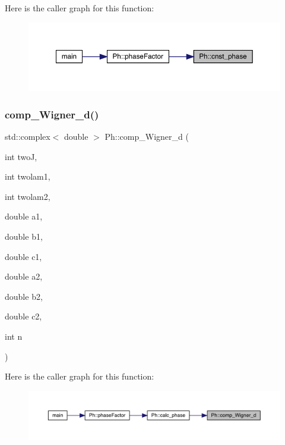Here is the caller graph for this function\+:\nopagebreak
\begin{figure}[H]
\begin{center}
\leavevmode
\includegraphics[width=350pt]{d6/d3c/namespacePh_ac0bb2f4b2888c7c304cb6fcb1b5a7ce2_icgraph}
\end{center}
\end{figure}
\mbox{\label{namespacePh_a65b264daca1c3c0fcc6f1dc55d729cd4}} 
\subsubsection{\texorpdfstring{comp\_Wigner\_d()}{comp\_Wigner\_d()}}
{\footnotesize\ttfamily std\+::complex$<$ double $>$ Ph\+::comp\+\_\+\+Wigner\+\_\+d (\begin{DoxyParamCaption}\item[{int}]{twoJ,  }\item[{int}]{twolam1,  }\item[{int}]{twolam2,  }\item[{double}]{a1,  }\item[{double}]{b1,  }\item[{double}]{c1,  }\item[{double}]{a2,  }\item[{double}]{b2,  }\item[{double}]{c2,  }\item[{int}]{n }\end{DoxyParamCaption})}

Here is the caller graph for this function\+:\nopagebreak
\begin{figure}[H]
\begin{center}
\leavevmode
\includegraphics[width=350pt]{d6/d3c/namespacePh_a65b264daca1c3c0fcc6f1dc55d729cd4_icgraph}
\end{center}
\end{figure}
\mbox{\label{namespacePh_ad2fd8f885053b0833441c8388a9218b8}} 
